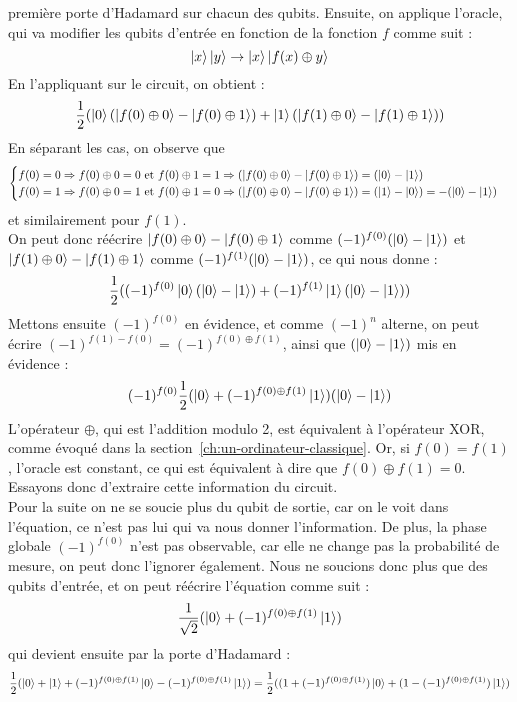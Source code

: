 première porte d'Hadamard sur chacun des qubits.
Ensuite, on applique l'oracle, qui va modifier les qubits d'entrée en fonction de la
fonction $f$ comme suit :
\[
    \ket{x}\ket{y} \rightarrow \ket{x}\ket{f(x) \oplus y}
\]
En l'appliquant sur le circuit, on obtient :
\[
    \frac{1}{2}(\ket{0} (\ket{f(0) \oplus 0}-\ket{f(0) \oplus 1}) + \ket{1}(\ket{f(1) \oplus 0}-\ket{f(1) \oplus 1}))
\]
En séparant les cas, on observe que
\[
    \begin{cases}
        f(0) = 0 \Rightarrow f(0) \oplus 0 = 0 \text{ et } f(0) \oplus 1 = 1 \Rightarrow (\ket{f(0) \oplus 0}-\ket{f(0) \oplus 1}) = (\ket{0}-\ket{1})\\
        f(0) = 1 \Rightarrow f(0) \oplus 0 = 1 \text{ et } f(0) \oplus 1 = 0 \Rightarrow (\ket{f(0) \oplus 0}-\ket{f(0) \oplus 1}) = (\ket{1}-\ket{0}) = -(\ket{0}-\ket{1})
    \end{cases}
\]
et similairement pour $f(1)$.\\
On peut donc réécrire $\ket{f(0) \oplus 0}-\ket{f(0) \oplus 1}$ comme $(-1)^{f(0)}(\ket{0}-\ket{1})$
et $\ket{f(1) \oplus 0}-\ket{f(1) \oplus 1}$ comme $(-1)^{f(1)}(\ket{0}-\ket{1})$,
ce qui nous donne :
\[
    \frac{1}{2}((-1)^{f(0)} \ket{0} (\ket{0}-\ket{1}) + (-1)^{f(1)} \ket{1}(\ket{0}-\ket{1}))
\]
Mettons ensuite $(-1)^{f(0)}$ en évidence, et comme $(-1)^n$ alterne, on peut écrire
$(-1)^{f(1) - f(0)} = (-1)^{f(0) \oplus f(1)}$, ainsi que $(\ket{0}-\ket{1})$ mis en évidence :
\[
    (-1)^{f(0)} \frac{1}{2} (\ket{0} + (-1)^{f(0) \oplus f(1)} \ket{1})(\ket{0}-\ket{1})
\]
L'opérateur $\oplus$, qui est l'addition modulo 2, est équivalent à l'opérateur XOR, comme évoqué dans la section~\ref{ch:un-ordinateur-classique}.
Or, si $f(0) = f(1)$, l'oracle est constant, ce qui est équivalent à dire que $f(0) \oplus f(1) = 0$.
Essayons donc d'extraire cette information du circuit.\\
Pour la suite on ne se soucie plus du qubit de sortie, car on le voit dans l'équation,
ce n'est pas lui qui va nous donner l'information.
De plus, la phase globale $(-1)^{f(0)}$ n'est pas observable, car elle ne change pas
la probabilité de mesure, on peut donc l'ignorer également.
Nous ne soucions donc plus que des qubits d'entrée, et on peut réécrire l'équation
comme suit :
\[
    \frac{1}{\sqrt{2}} (\ket{0} + (-1)^{f(0) \oplus f(1)} \ket{1})
\]
qui devient ensuite par la porte d'Hadamard :
\[
    \frac{1}{2} (\ket{0} + \ket{1} + (-1)^{f(0) \oplus f(1)} \ket{0} - (-1)^{f(0) \oplus f(1)} \ket{1}) = \frac{1}{2} ((1 + (-1)^{f(0) \oplus f(1)}) \ket{0} + (1 - (-1)^{f(0) \oplus f(1)}) \ket{1})
\]
